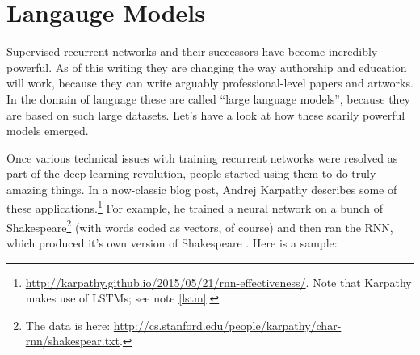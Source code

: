 
\section{Langauge Models}


Supervised recurrent networks and their successors have become incredibly powerful. As of this writing they are changing the way authorship and education will work, because they can write arguably professional-level papers and artworks.  In the domain of language these are called ``large language models'', because they are based on such large datasets.  Let's have a look at how these scarily powerful models emerged.

Once various technical issues with training recurrent networks were resolved as part of the deep learning revolution, people started using them to do truly amazing things. In a now-classic blog post, Andrej Karpathy describes some of these applications.\footnote{\url{http://karpathy.github.io/2015/05/21/rnn-effectiveness/}. Note that Karpathy makes use of LSTMs; see note \ref{lstm}.}  For example, he trained a neural network on a bunch of Shakespeare\footnote{The data is here: \url{http://cs.stanford.edu/people/karpathy/char-rnn/shakespear.txt}.}  (with words coded as vectors, of course) and then ran the RNN, which produced it's own version of Shakespeare \cite{karpathy2015unreasonable}. Here is a sample:

